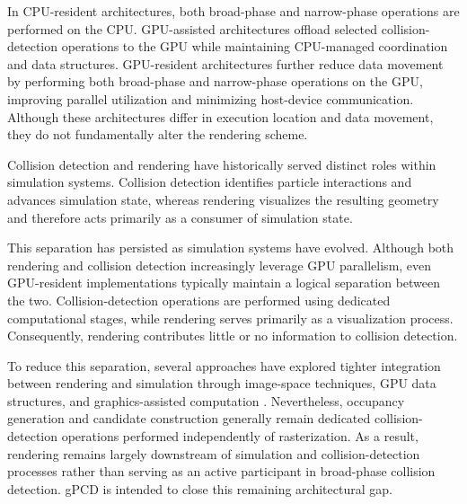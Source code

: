 In CPU-resident architectures, both broad-phase and narrow-phase
operations are performed on the CPU. GPU-assisted architectures offload
selected collision-detection operations to the GPU while maintaining
CPU-managed coordination and data structures. GPU-resident
architectures further reduce data movement by performing both
broad-phase and narrow-phase operations on the GPU, improving parallel
utilization and minimizing host-device communication. Although these architectures differ in execution location and data movement, they do not fundamentally alter the rendering scheme.

Collision detection and rendering have historically served distinct
roles within simulation systems. Collision detection identifies particle
interactions and advances simulation state, whereas rendering
visualizes the resulting geometry and therefore acts primarily as a
consumer of simulation state.

This separation has persisted as simulation systems have evolved.
Although both rendering and collision detection increasingly leverage
GPU parallelism, even GPU-resident implementations
\cite{he2018,Harada2007} typically maintain a logical separation between
the two. Collision-detection operations are performed using dedicated
computational stages, while rendering serves primarily as a
visualization process. Consequently, rendering contributes little or no
information to collision detection.

To reduce this separation, several approaches have explored tighter
integration between rendering and simulation through image-space
techniques, GPU data structures, and graphics-assisted computation
\cite{Faure2008}. Nevertheless, occupancy generation and candidate
construction generally remain dedicated collision-detection operations
performed independently of rasterization. As a result, rendering
remains largely downstream of simulation and collision-detection
processes rather than serving as an active participant in broad-phase
collision detection. gPCD is intended to close this remaining architectural gap.


